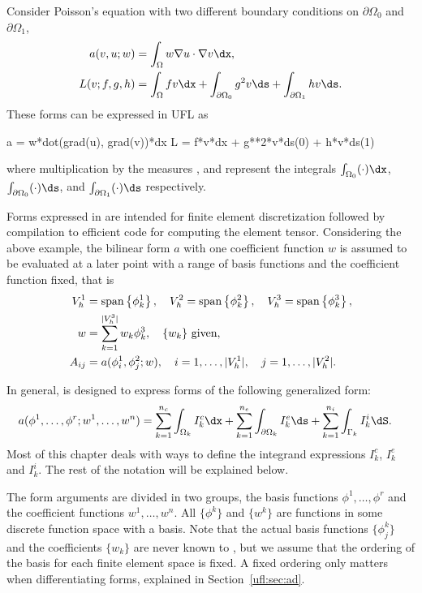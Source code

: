 Consider Poisson's equation with two different boundary
conditions on $\partial\Omega_0$ and $\partial\Omega_1$,
\begin{align}
a(v, u; w) &= \int_\Omega w \nabla u \cdot \nabla v \dx, \\
L(v; f, g, h) &= \int_\Omega f v \dx + \int_{\partial\Omega_0} g^2 v \ds + \int_{\partial\Omega_1} h v \ds.
\end{align}
These forms can be expressed in UFL as
\begin{python}
a = w*dot(grad(u), grad(v))*dx
L = f*v*dx + g**2*v*ds(0) + h*v*ds(1)
\end{python}
where multiplication by the measures ,  and 
represent the integrals $\int_{\Omega_0} (\cdot) \dx$,
$\int_{\partial\Omega_0} (\cdot) \ds$,
and $\int_{\partial\Omega_1} (\cdot) \ds$
respectively.

Forms expressed in \ufl{} are intended for finite element
discretization followed by compilation to efficient code for computing
the element tensor.  Considering the above example, the bilinear form
$a$ with one coefficient function $w$ is assumed to be evaluated at a
later point with a range of basis functions and the coefficient
function fixed, that is
\begin{align}
V_h^1 &= \operatorname{span}\left\{ \phi_k^1 \right\}, \quad V_h^2 = \operatorname{span}\left\{ \phi_k^2 \right\}, \quad V_h^3 = \operatorname{span}\left\{ \phi_k^3 \right\}, \\
w &= \sum_{k=1}^{|V^3_h|} w_k \phi_k^3, \quad \{ w_k \} \mbox{ given}, \\
A_{ij} &= a(\phi_i^1, \phi_j^2; w),
    \quad i = 1,\ldots,|V^1_h|, \quad j = 1,\ldots,|V^2_h| . \label{ufl:eq:Aij}
\end{align}

In general, \ufl{} is designed to express forms of the following generalized form:
\begin{align} \label{ufl:eq:form_integrals}
    a(&\phi^1, \ldots, \phi^r; w^1, \ldots,  w^n) =
           \sum_{k=1}^{n_c} \int_{\Omega_k}          I^c_k \dx
         + \sum_{k=1}^{n_e} \int_{\partial\Omega_k}  I^e_k \ds
         + \sum_{k=1}^{n_i} \int_{\Gamma_k}          I^i_k \dS.
\end{align}
Most of this chapter deals with ways to define the integrand
expressions $I^c_k$, $I^e_k$ and $I^i_k$.  The rest of the notation
will be explained below.

The form arguments are divided in two groups, the basis functions
$\phi^1,\ldots,\phi^r$ and the coefficient functions $w^1,\ldots,w^n$.
All $\{ \phi^k \}$ and $\{ w^k \}$ are functions in some discrete
function space with a basis.  Note that the actual basis functions $\{
\phi_j^k \}$ and the coefficients $\{ w_k \}$ are never known to
\ufl{}, but we assume that the ordering of the basis for each finite
element space is fixed. A fixed ordering only matters when
differentiating forms, explained in Section~\ref{ufl:sec:ad}.

